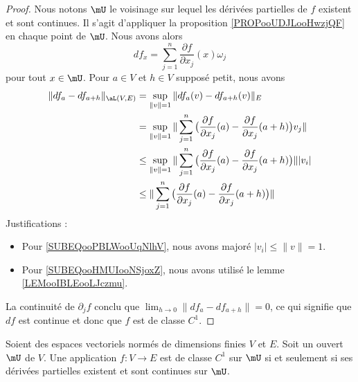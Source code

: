 \begin{proof}
    Nous notons \( \mU\) le voisinage sur lequel les dérivées partielles de \( f\) existent et sont continues. Il s'agit d'appliquer la proposition \ref{PROPooUDJLooHwzjQF} en chaque point de \( \mU\). Nous avons alors
    \begin{equation}
        df_x=\sum_{j=1}^n\frac{ \partial f }{ \partial x_j }(x)\omega_j
    \end{equation}
    pour tout \( x\in \mU\). Pour \( a\in V\) et \( h\in V\) supposé petit, nous avons
    \begin{subequations}
        \begin{align}
            \| df_a-df_{a+h} \|_{\aL(V,E)}&=\sup_{\| v \|=1}\| df_a(v)-df_{a+h}(v) \|_E\\
            &=\sup_{\| v \|=1}\| \sum_{j=1}^n\big( \frac{ \partial f }{ \partial x_j }(a)-\frac{ \partial f }{ \partial x_j }(a+h) \big)v_j \|\\
            &\leq \sup_{\| v \|=1}\| \sum_{j=1}^n\big( \frac{ \partial f }{ \partial x_j }(a)-\frac{ \partial f }{ \partial x_j }(a+h) \big) \| |v_i |     \label{SUBEQooHMUIooNSjoxZ}\\
            &\leq\| \sum_{j=1}^n\big( \frac{ \partial f }{ \partial x_j }(a)-\frac{ \partial f }{ \partial x_j }(a+h) \big) \|      \label{SUBEQooPBLWooUqNlhV}
        \end{align}
    \end{subequations}
    Justifications :
    \begin{itemize}
        \item 
            Pour \eqref{SUBEQooPBLWooUqNlhV}, nous avons majoré \( | v_i |\leq \| v \|=1\).
        \item
            Pour \eqref{SUBEQooHMUIooNSjoxZ}, nous avons utilisé le lemme \ref{LEMooIBLEooLJczmu}.
    \end{itemize}
    La continuité de \( \partial_jf\) conclu que \( \lim_{h\to 0}\|  df_a-df_{a+h}  \|=0\), ce qui signifie que \( df\) est continue et donc que \( f\) est de classe \( C^1\).
\end{proof}
 
\begin{theorem}     \label{THOooBEAOooBdvOdr}
    Soient des espaces vectoriels normés de dimensions finies \( V\) et \( E\). Soit un ouvert \( \mU\) de \( V\). Une application \( f\colon V\to E\) est de classe \( C^1\) sur \( \mU\) si et seulement si ses dérivées partielles existent et sont continues sur \( \mU\).
\end{theorem}

